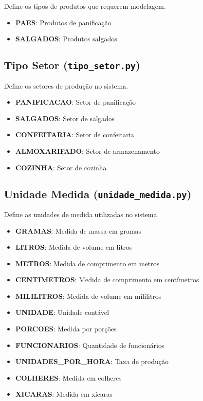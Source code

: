 \documentclass[11pt,a4paper]{article}
\begin{document}
Define os tipos de produtos que requerem modelagem.

\begin{itemize}[leftmargin=2cm]
    \item \textbf{PAES}: Produtos de panificação
    \item \textbf{SALGADOS}: Produtos salgados
\end{itemize}

\subsection{Tipo Setor (\texttt{tipo\_setor.py})}

Define os setores de produção no sistema.

\begin{itemize}[leftmargin=2cm]
    \item \textbf{PANIFICACAO}: Setor de panificação
    \item \textbf{SALGADOS}: Setor de salgados
    \item \textbf{CONFEITARIA}: Setor de confeitaria
    \item \textbf{ALMOXARIFADO}: Setor de armazenamento
    \item \textbf{COZINHA}: Setor de cozinha
\end{itemize}

\subsection{Unidade Medida (\texttt{unidade\_medida.py})}

Define as unidades de medida utilizadas no sistema.

\begin{itemize}[leftmargin=2cm]
    \item \textbf{GRAMAS}: Medida de massa em gramas
    \item \textbf{LITROS}: Medida de volume em litros
    \item \textbf{METROS}: Medida de comprimento em metros
    \item \textbf{CENTIMETROS}: Medida de comprimento em centímetros
    \item \textbf{MILILITROS}: Medida de volume em mililitros
    \item \textbf{UNIDADE}: Unidade contável
    \item \textbf{PORCOES}: Medida por porções
    \item \textbf{FUNCIONARIOS}: Quantidade de funcionários
    \item \textbf{UNIDADES\_POR\_HORA}: Taxa de produção
    \item \textbf{COLHERES}: Medida em colheres
    \item \textbf{XICARAS}: Medida em xícaras
\end{itemize}
\end{document}
